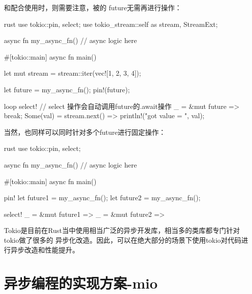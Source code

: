 和配合使用时，则需要注意，被的
future无需再进行操作：
\begin{code-block}{rust}
use tokio::{pin, select};
use tokio_stream::{self as stream, StreamExt};

async fn my_async_fn() {
    // async logic here
}

#[tokio::main]
async fn main() {
    let mut stream = stream::iter(vec![1, 2, 3, 4]);

    let future = my_async_fn();
    pin!(future);

    loop {
        select! {
            // select 操作会自动调用future的.await操作
            _ = &mut future => {
                break;
            }
            Some(val) = stream.next() => {
                println!("got value = {}", val);
            }
        }
    }
}
\end{code-block}

当然，也同样可以同时针对多个future进行固定操作：
\begin{code-block}{rust}
use tokio::{pin, select};

async fn my_async_fn() {
    // async logic here
}

#[tokio::main]
async fn main() {
    pin! {
        let future1 = my_async_fn();
        let future2 = my_async_fn();
    }

    select! {
        _ = &mut future1 => {}
        _ = &mut future2 => {}
    }
}
\end{code-block}

Tokio是目前在Rust当中使用相当广泛的异步开发库，相当多的类库都专门针对tokio做了很多的
异步化改造。因此，可以在绝大部分的场景下使用tokio对代码进行异步改造和性能提升。

\section{异步编程的实现方案-mio}

